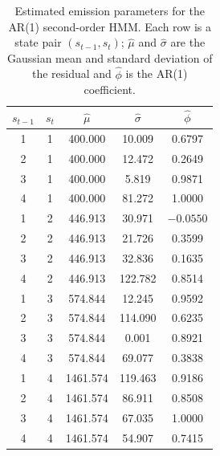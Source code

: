 \begin{table}[H]
\centering
\begin{tabular}{ccccc}
\hline
$s_{t-1}$ & $s_t$ & $\hat{\mu}$ & $\hat{\sigma}$ & $\hat{\phi}$ \\
\hline
1 & 1 & 400.000 & 10.009 & 0.6797 \\
2 & 1 & 400.000 & 12.472 & 0.2649 \\
3 & 1 & 400.000 & 5.819 & 0.9871 \\
4 & 1 & 400.000 & 81.272 & 1.0000 \\
\hline
1 & 2 & 446.913 & 30.971 & $-0.0550$ \\
2 & 2 & 446.913 & 21.726 & 0.3599 \\
3 & 2 & 446.913 & 32.836 & 0.1635 \\
4 & 2 & 446.913 & 122.782 & 0.8514 \\
\hline
1 & 3 & 574.844 & 12.245 & 0.9592 \\
2 & 3 & 574.844 & 114.090 & 0.6235 \\
3 & 3 & 574.844 & 0.001 & 0.8921 \\
4 & 3 & 574.844 & 69.077 & 0.3838 \\
\hline
1 & 4 & 1461.574 & 119.463 & 0.9186 \\
2 & 4 & 1461.574 & 86.911 & 0.8508 \\
3 & 4 & 1461.574 & 67.035 & 1.0000 \\
4 & 4 & 1461.574 & 54.907 & 0.7415 \\
\hline
\end{tabular}
\caption{Estimated emission parameters for the AR(1) second-order HMM. Each row is a state pair $(s_{t-1}, s_t)$; $\hat{\mu}$ and $\hat{\sigma}$ are the Gaussian mean and standard deviation of the residual and $\hat{\phi}$ is the AR(1) coefficient.}
\label{tab:second_order_hmm_emissions}
\end{table}
